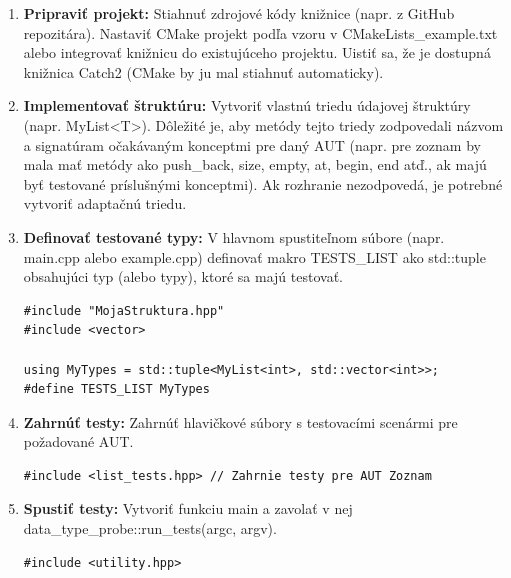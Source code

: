 \documentclass[11pt]{article}
\begin{document}
\begin{enumerate}
\item \textbf{Pripraviť projekt:} Stiahnuť zdrojové kódy knižnice (napr. z GitHub repozitára). Nastaviť CMake projekt podľa vzoru v CMakeLists\_example.txt alebo integrovať knižnicu do existujúceho projektu. Uistiť sa, že je dostupná knižnica Catch2 (CMake by ju mal stiahnuť automaticky).
\item \textbf{Implementovať štruktúru:} Vytvoriť vlastnú triedu údajovej štruktúry (napr. MyList<T>). Dôležité je, aby metódy tejto triedy zodpovedali názvom a signatúram očakávaným konceptmi pre daný AUT (napr. pre zoznam by mala mať metódy ako push\_back, size, empty, at, begin, end atď., ak majú byť testované príslušnými konceptmi). Ak rozhranie nezodpovedá, je potrebné vytvoriť adaptačnú triedu.
\item \textbf{Definovať testované typy:} V hlavnom spustiteľnom súbore (napr. main.cpp alebo example.cpp) definovať makro TESTS\_LIST ako std::tuple obsahujúci typ (alebo typy), ktoré sa majú testovať.
\begin{lstlisting}
#include "MojaStruktura.hpp"
#include <vector>

using MyTypes = std::tuple<MyList<int>, std::vector<int>>;
#define TESTS_LIST MyTypes
\end{lstlisting}
\item \textbf{Zahrnúť testy:} Zahrnúť hlavičkové súbory s testovacími scenármi pre požadované AUT.
\begin{lstlisting}
#include <list_tests.hpp> // Zahrnie testy pre AUT Zoznam
\end{lstlisting}
\item \textbf{Spustiť testy:} Vytvoriť funkciu main a zavolať v nej data\_type\_probe::run\_tests(argc, argv).
\begin{lstlisting}
#include <utility.hpp>


\end{lstlisting}
\end{enumerate}
\end{document}
